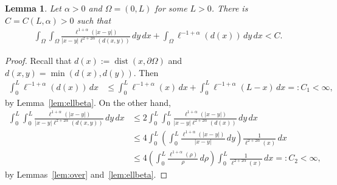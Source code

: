 \documentclass[10 pt]{article}
\newtheorem{lemma}[theorem]{Lemma}
\numberwithin{equation}{section}
\def\dist{\operatorname{dist}}
\begin{document}
\begin{lemma}\label{lem:int:bds}
Let $\alpha>0$ and $\Omega=(0,L)$ for some $L>0$. There is $C=C(L,\alpha)>0$ such that 
\begin{align*}
\int_{\Omega}\int_{\Omega}\frac{\ell^{1+\alpha}(|x-y|)}{|x-y|\ell^{2+2\alpha}(d(x,y))}\,dy\, dx+ \int_{\Omega}\ell^{-1+\alpha}(d(x))\, dy\,dx<C.
\end{align*}
\end{lemma}
\begin{proof}
Recall that $d(x):=\dist(x,\partial \Omega)$ and $d(x,y)=\min(d(x),d(y)).$ Then
\begin{align*}
\int_0^L \ell^{-1+\alpha}(d(x))\,dx&\leq \int_0^L \ell^{-1+\alpha}(x)\,dx+\int_0^L \ell^{-1+\alpha}(L-x)\,dx=:C_1<\infty,
\end{align*}
by Lemma~\ref{lem:ellbeta}. On the other hand,
\begin{align*}
\int_0^L\int_0^L\frac{\ell^{1+\alpha}(|x-y|)}{|x-y|\ell^{2+2\alpha}(d(x,y))}\,dy\, dx
&\leq 2\int_0^L\int_0^L\frac{\ell^{1+\alpha}(|x-y|)}{|x-y|\ell^{2+2\alpha}(d(x))}\,dy\, dx\\
&\leq 4\int_0^L\left(\int_0^L\frac{\ell^{1+\alpha}(|x-y|)}{|x-y|}\,dy\right)\frac{1}{\ell^{2+2\alpha}(x)}\, dx\\
&\leq 4\left(\int_0^L\frac{\ell^{1+\alpha}(\rho)}{\rho}\,d\rho\right)\int_0^L\frac{1}{\ell^{2+2\alpha}(x)}\, dx=:C_2<\infty,
\end{align*}
by Lemmas~\ref{lem:over} and~\ref{lem:ellbeta}.
\end{proof}
\end{document}
